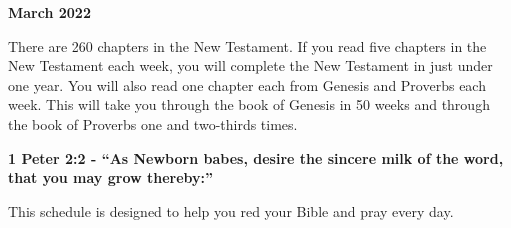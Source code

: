 \documentclass[11pt,landscape,twocolumn,letterpaper]{article}
\begin{document}

\begin{center}
\textbf{March 2022}
\end{center}
There are 260 chapters in the New Testament.  If you read five chapters in the New Testament each week, you will complete the New Testament in just under one year.  You will also read one chapter each from Genesis and Proverbs each week.  This will take you through the book of Genesis in 50 weeks and through the book of Proverbs one and two-thirds times.

\begin{center}
\textcolor[rgb]{0.00,0.00,1.00}{\textbf{1 Peter 2:2 - ``As Newborn babes, desire the sincere milk of the word, that you may grow thereby:''}}
\end{center}

This schedule is designed to help you red your Bible and pray every day.\\
\end{document}
